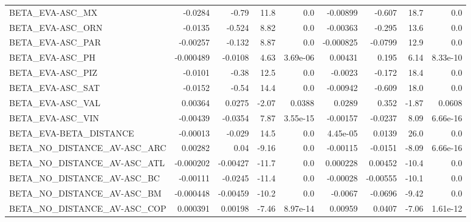 \begin{tabular}{lrrrrrrrr}
BETA\_EVA-ASC\_MX                         &     -0.0284 &        -0.79 &    11.8 &      0.0 &   -0.00899 &      -0.607 &         18.7 &           0.0 \\
BETA\_EVA-ASC\_ORN                        &     -0.0135 &       -0.524 &    8.82 &      0.0 &   -0.00363 &      -0.295 &         13.6 &           0.0 \\
BETA\_EVA-ASC\_PAR                        &    -0.00257 &       -0.132 &    8.87 &      0.0 &  -0.000825 &     -0.0799 &         12.9 &           0.0 \\
BETA\_EVA-ASC\_PH                         &   -0.000489 &      -0.0108 &    4.63 & 3.69e-06 &    0.00431 &       0.195 &         6.14 &      8.33e-10 \\
BETA\_EVA-ASC\_PIZ                        &     -0.0101 &        -0.38 &    12.5 &      0.0 &    -0.0023 &      -0.172 &         18.4 &           0.0 \\
BETA\_EVA-ASC\_SAT                        &     -0.0152 &        -0.54 &    14.4 &      0.0 &   -0.00942 &      -0.609 &         18.0 &           0.0 \\
BETA\_EVA-ASC\_VAL                        &     0.00364 &       0.0275 &   -2.07 &   0.0388 &     0.0289 &       0.352 &        -1.87 &        0.0608 \\
BETA\_EVA-ASC\_VIN                        &    -0.00439 &      -0.0354 &    7.87 & 3.55e-15 &   -0.00157 &     -0.0237 &         8.09 &      6.66e-16 \\
BETA\_EVA-BETA\_DISTANCE                  &    -0.00013 &       -0.029 &    14.5 &      0.0 &   4.45e-05 &      0.0139 &         26.0 &           0.0 \\
BETA\_NO\_DISTANCE\_AV-ASC\_ARC             &     0.00282 &         0.04 &   -9.16 &      0.0 &   -0.00115 &     -0.0151 &        -8.09 &      6.66e-16 \\
BETA\_NO\_DISTANCE\_AV-ASC\_ATL             &   -0.000202 &     -0.00427 &   -11.7 &      0.0 &   0.000228 &     0.00452 &        -10.4 &           0.0 \\
BETA\_NO\_DISTANCE\_AV-ASC\_BC              &    -0.00111 &      -0.0245 &   -11.4 &      0.0 &   -0.00028 &    -0.00555 &        -10.1 &           0.0 \\
BETA\_NO\_DISTANCE\_AV-ASC\_BM              &   -0.000448 &     -0.00459 &   -10.2 &      0.0 &    -0.0067 &     -0.0696 &        -9.42 &           0.0 \\
BETA\_NO\_DISTANCE\_AV-ASC\_COP             &    0.000391 &      0.00198 &   -7.46 & 8.97e-14 &    0.00959 &      0.0407 &        -7.06 &      1.61e-12 \\

\end{tabular}
